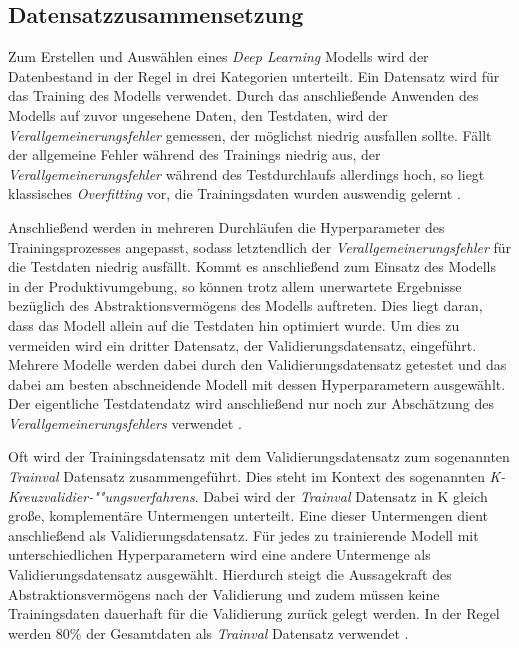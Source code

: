 \subsection*{Datensatzzusammensetzung}

Zum Erstellen und Auswählen eines \textit{Deep Learning} Modells wird der Datenbestand in der Regel in drei Kategorien unterteilt. Ein Datensatz wird für das Training des Modells verwendet. Durch das anschließende Anwenden des Modells auf zuvor ungesehene Daten, den Testdaten, wird der \textit{Verallgemeinerungsfehler} gemessen, der möglichst niedrig ausfallen sollte. Fällt der allgemeine Fehler während des Trainings niedrig aus, der \textit{Verallgemeinerungsfehler} während des Testdurchlaufs allerdings hoch, so liegt klassisches \textit{Overfitting} vor, die Trainingsdaten wurden auswendig gelernt \cite{AurelienGeron.2018}. 

Anschließend werden in mehreren Durchläufen die Hyperparameter des Trainingsprozesses angepasst, sodass letztendlich der \textit{Verallgemeinerungsfehler} für die Testdaten niedrig ausfällt. Kommt es anschließend zum Einsatz des Modells in der Produktivumgebung, so können trotz allem unerwartete Ergebnisse bezüglich des Abstraktionsvermögens des Modells auftreten. Dies liegt daran, dass das Modell allein auf die Testdaten hin optimiert wurde. Um dies zu vermeiden wird ein dritter Datensatz, der Validierungsdatensatz, eingeführt. Mehrere Modelle werden dabei durch den Validierungsdatensatz getestet und das dabei am besten abschneidende Modell mit dessen Hyperparametern ausgewählt. Der eigentliche Testdatendatz wird anschließend nur noch zur Abschätzung des \textit{Verallgemeinerungsfehlers} verwendet \cite{AurelienGeron.2018}. 

Oft wird der Trainingsdatensatz mit dem Validierungsdatensatz zum sogenannten \textit{Trainval} Datensatz zusammengeführt. Dies steht im Kontext des sogenannten \textit{K-Kreuzvalidier-""ungsverfahrens}. Dabei wird der \textit{Trainval} Datensatz in K gleich große, komplementäre Untermengen unterteilt. Eine dieser Untermengen dient anschließend als Validierungsdatensatz. Für jedes zu trainierende Modell mit unterschiedlichen Hyperparametern wird eine andere Untermenge als Validierungsdatensatz ausgewählt. Hierdurch steigt die Aussagekraft des Abstraktionsvermögens nach der Validierung und zudem müssen keine Trainingsdaten dauerhaft für die Validierung zurück gelegt werden. In der Regel werden 80\% der Gesamtdaten als \textit{Trainval} Datensatz verwendet \cite{AurelienGeron.2018}.

